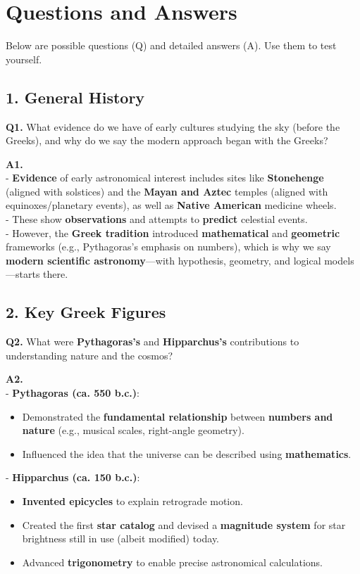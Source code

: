 \section*{Questions and Answers}

Below are possible questions (Q) and detailed answers (A). Use them to test yourself.

\hrulefill

\subsection*{1. General History}

\textbf{Q1.} What evidence do we have of early cultures studying the sky (before the Greeks), and why do we say the modern approach began with the Greeks?

\textbf{A1.}\\
- \textbf{Evidence} of early astronomical interest includes sites like \textbf{Stonehenge} (aligned with solstices) and the \textbf{Mayan and Aztec} temples (aligned with equinoxes/planetary events), as well as \textbf{Native American} medicine wheels.\\
- These show \textbf{observations} and attempts to \textbf{predict} celestial events.\\
- However, the \textbf{Greek tradition} introduced \textbf{mathematical} and \textbf{geometric} frameworks (e.g., Pythagoras’s emphasis on numbers), which is why we say \textbf{modern scientific astronomy}---with hypothesis, geometry, and logical models---starts there.

\subsection*{2. Key Greek Figures}

\textbf{Q2.} What were \textbf{Pythagoras’s} and \textbf{Hipparchus’s} contributions to understanding nature and the cosmos?

\textbf{A2.}\\
- \textbf{Pythagoras (ca. 550 b.c.)}:
  \begin{itemize}
    \item Demonstrated the \textbf{fundamental relationship} between \textbf{numbers and nature} (e.g., musical scales, right-angle geometry).
    \item Influenced the idea that the universe can be described using \textbf{mathematics}.
  \end{itemize}
- \textbf{Hipparchus (ca. 150 b.c.)}:
  \begin{itemize}
    \item \textbf{Invented epicycles} to explain retrograde motion.
    \item Created the first \textbf{star catalog} and devised a \textbf{magnitude system} for star brightness still in use (albeit modified) today.
    \item Advanced \textbf{trigonometry} to enable precise astronomical calculations.
  \end{itemize}

